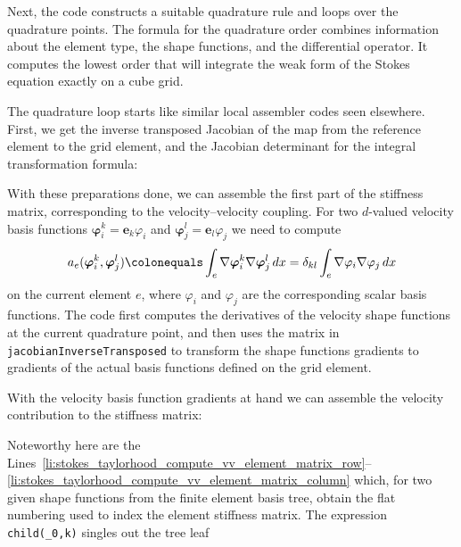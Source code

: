 \documentclass[a4paper,10pt,headings=normal,bibliography=totoc]{scrartcl}
\newcommand{\cpp}[1]{\lstinline[basicstyle=\ttfamily]!#1!}
\begin{document}
Next, the code constructs a suitable quadrature rule and loops over the quadrature points.  The formula for the quadrature
order combines information about the element type, the shape functions, and the differential operator.
It computes the lowest order that will integrate the weak form of the Stokes equation exactly
on a cube grid.
%

%
The quadrature loop starts like similar local assembler codes seen elsewhere.
First, we get the inverse transposed Jacobian
of the map from the reference element to the grid element, and the Jacobian determinant for the integral
transformation formula:
%

%
With these preparations done, we can assemble the first part of the stiffness matrix,  corresponding to the
velocity--velocity coupling.  For two $d$-valued velocity basis functions $\bm{\varphi}_i^k = \mathbf{e}_k \varphi_i$
and $\bm{\varphi}_j^l = \mathbf{e}_l \varphi_j$ we need to compute
\begin{equation*}
 a_e(\bm{\varphi}_i^k, \bm{\varphi}_j^l)
 \colonequals
 \int_e \nabla \bm{\varphi}_i^k \nabla \bm{\varphi}_j^l \,dx
 =
 \delta_{kl} \int_e \nabla \varphi_i \nabla \varphi_j \,dx
\end{equation*}
on the current element $e$,
where $\varphi_i$ and $\varphi_j$ are the corresponding scalar basis functions.
The code first computes the derivatives of the velocity
shape functions at the current quadrature point,
and then uses the matrix in \cpp{jacobianInverseTransposed} to transform the shape functions gradients to
gradients of the actual basis functions defined on the grid element.
%

%
With the velocity basis function gradients at hand we can assemble the velocity contribution
to the stiffness matrix:
%

%
Noteworthy here are the Lines~\ref{li:stokes_taylorhood_compute_vv_element_matrix_row}--\ref{li:stokes_taylorhood_compute_vv_element_matrix_column} which,
for two given shape functions from the finite element basis tree, obtain the flat numbering
used to index the element stiffness matrix.  The expression \cpp{child(_0,k)} singles out the tree leaf
\end{document}
